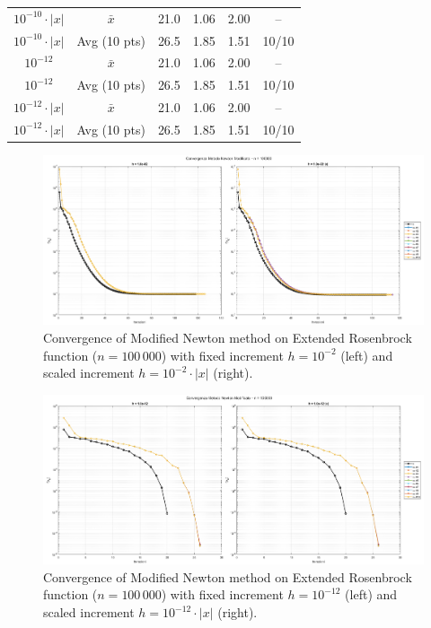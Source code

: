 \documentclass[a4paper,12pt]{article}
\begin{document}
\begin{table}[htbp]
{\begin{tabular}{|c|c|c|c|c|c|}
				$10^{-10}\cdot|x|$   & $\bar{x}$       & 21.0  & 1.06  & 2.00 & --     \\
				$10^{-10}\cdot|x|$   & Avg (10 pts)    & 26.5  & 1.85  & 1.51 & 10/10 \\
				\hline
				$10^{-12}$           & $\bar{x}$       & 21.0  & 1.06  & 2.00 & --     \\
				$10^{-12}$           & Avg (10 pts)    & 26.5  & 1.85  & 1.51 & 10/10 \\
				$10^{-12}\cdot|x|$   & $\bar{x}$       & 21.0  & 1.06  & 2.00 & --     \\
				$10^{-12}\cdot|x|$   & Avg (10 pts)    & 26.5  & 1.85  & 1.51 & 10/10 \\
				\hline
			\end{tabular}%
		}
		\label{tab:fd_results_100k}
	\end{table}
	\begin{figure}[htbp]
		\centering
		\includegraphics[width=\textwidth]{../immagini/ext_100k_h2.png}
		\caption{Convergence of Modified Newton method on Extended Rosenbrock function ($n=100\,000$) with fixed increment $h = 10^{-2}$ (left) and scaled increment $h = 10^{-2}\cdot|x|$ (right).}
		\label{fig:fd_100k_h2}
	\end{figure}
	
	\begin{figure}[htbp]
		\centering
		\includegraphics[width=\textwidth]{../immagini/ext_100k_h12.png}
		\caption{Convergence of Modified Newton method on Extended Rosenbrock function ($n=100\,000$) with fixed increment $h = 10^{-12}$ (left) and scaled increment $h = 10^{-12}\cdot|x|$ (right).}
		\label{fig:fd_100k_h12}
	\end{figure}
	\newpage
\end{document}

